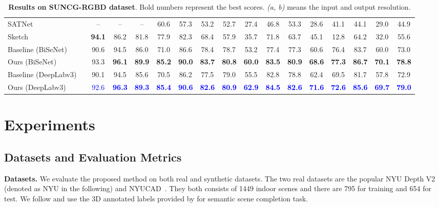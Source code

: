 \documentclass[final]{cvpr}
\begin{document}
\begin{table*}[t!]
\begin{center}
{\begin{tabular}{|l| c |c c c|c c c c c c c c c c c | c|}
SATNet~\cite{liu2018see-satnet}& 
& -- & -- & -- & 60.6 & 57.3 & 53.2 & 52.7 & 27.4 & 46.8 & 53.3 & 28.6 & 41.1 & 44.1 & 29.0 & 44.9\\
Sketch~\cite{Chen_2020_SketchAwareSSC}&  
& 	\textbf{94.1}&	86.2& 81.8& 77.9&	82.3&	68.4&	57.9&	35.7&	71.8&	63.7&	45.1&	12.8&	64.2&	32.0&	55.6\\
\hline
\hline
Baseline (BiSeNet) &  & 90.6&	94.5& 86.0&	71.0&	86.6&	78.4&	78.7&	53.2&	77.4&	77.3&	60.6&	76.4&	83.7&	60.0&	73.0\\



Ours (BiSeNet) &    &
93.3&	\textbf{96.1}&	\textbf{89.9}&	\textbf{85.2}&	\textbf{90.0}&	\textbf{83.7}&	\textbf{80.8}&	\textbf{60.0}&	\textbf{83.5}&	\textbf{80.9}&	\textbf{68.6}&	\textbf{77.3}&	\textbf{86.7}&	\textbf{70.1}&	\textbf{78.8}\\
\hline
Baseline (DeepLabv3) &  & 90.1&	94.5&85.6&70.5&	86.2&	77.5&	79.0&	55.5&	82.8&	78.8&	62.4&	69.5&	81.7&	57.8&	72.9\\
Ours (DeepLabv3) &  &\textcolor{blue}{92.6} &\textcolor{blue}{\textbf{96.3}} &\textcolor{blue}{\textbf{89.3}}&\textcolor{blue}{\textbf{85.4}} &\textcolor{blue}{\textbf{90.6}} &\textcolor{blue}{\textbf{82.6}} &\textcolor{blue}{\textbf{80.9}} &\textcolor{blue}{\textbf{62.9}} &\textcolor{blue}{\textbf{84.5}} & \textcolor{blue}{\textbf{82.6}}&\textcolor{blue}{\textbf{71.6}} &\textcolor{blue}{\textbf{72.6}} &\textcolor{blue}{\textbf{85.6}}&\textcolor{blue}{\textbf{69.7}} & \textcolor{blue}{\textbf{79.0}}\\
\hline
\end{tabular}
}
\end{center}
\vspace{-0.2cm}
\caption{\textbf{Results on SUNCG-RGBD dataset}. Bold numbers represent the best scores. \textit{(a, b)} means the input and output resolution.}
\label{tab:SotaOnSUNCG}
\vspace{-0.6cm}
\end{table*}
 
\vspace{-0.2cm}
\section{Experiments}
\vspace{-0.1cm}
\subsection{Datasets and Evaluation Metrics}
\noindent \textbf{Datasets.} We evaluate the proposed method on both real and synthetic datasets. The two real datasets are the popular NYU Depth V2 \cite{nyudv2} (denoted as NYU in the following) and NYUCAD~\cite{firman2016structured}. They both consists of 1449 indoor scenes and there are 795 for training and 654 for test. We follow \cite{song2017semantic-sscnet} and use the 3D annotated labels provided by \cite{rock2015completing} for semantic scene completion task. 
\end{document}
